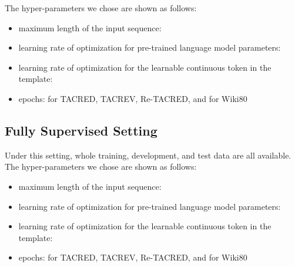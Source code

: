 \documentclass[11pt]{article}
\begin{document}
The hyper-parameters we chose are shown as follows:
\begin{itemize}
	\item maximum length of the input sequence: 
	\item learning rate of optimization for pre-trained language model parameters: 
	\item learning rate of optimization for the learnable continuous token in the template: 
	\item epochs:  for TACRED, TACREV, Re-TACRED,  and  for Wiki80
\end{itemize}

\subsection{Fully Supervised Setting}
Under this setting, whole training, development, and test data are all available. The hyper-parameters we chose are shown as follows:
\begin{itemize}
	\item maximum length of the input sequence: 
	\item learning rate of optimization for pre-trained language model parameters: 
	\item learning rate of optimization for the learnable continuous token in the template: 
	\item epochs:  for TACRED, TACREV, Re-TACRED,  and  for Wiki80
\end{itemize}
\end{document}
